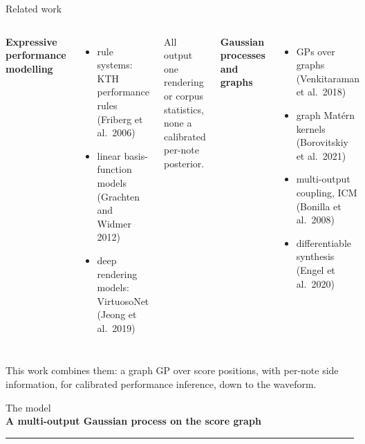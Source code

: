 \documentclass[aspectratio=169,11pt]{beamer}
\newcommand{\divider}[2]{\begin{frame}\centering\vfill
  {\small\textcolor{muted}{#1}}\\[2mm]
  {\LARGE\textbf{#2}}\\[4mm]
  {\color{okblue}\rule{62mm}{1.2pt}}\vfill\end{frame}}
\begin{document}
\begin{frame}{Related work}
  \begin{columns}[T,onlytextwidth]
  \textbf{Expressive performance modelling}
  {\small
  \begin{itemize}
    \item rule systems: KTH performance rules (Friberg et al.\ 2006)
    \item linear basis-function models (Grachten and Widmer 2012)
    \item deep rendering models: VirtuosoNet (Jeong et al.\ 2019)
  \end{itemize}
  All output one rendering or corpus statistics, none a calibrated
  per-note posterior.}
  \textbf{Gaussian processes and graphs}
  {\small
  \begin{itemize}
    \item GPs over graphs (Venkitaraman et al.\ 2018)
    \item graph Mat\'ern kernels (Borovitskiy et al.\ 2021)
    \item multi-output coupling, ICM (Bonilla et al.\ 2008)
    \item differentiable synthesis (Engel et al.\ 2020)
  \end{itemize}}
  \end{columns}
  \vfill
  This work combines them: a graph GP over score positions, with
  per-note side information, for calibrated performance inference, down
  to the waveform.
\end{frame}

\divider{The model}{A multi-output Gaussian process on the score graph}
\end{document}
